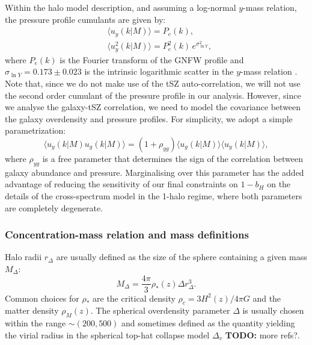 \documentclass[useAMS,usenatbib]{mn2e}
\newcommand{\TODO}[1]{{\bf TODO:} #1}
\begin{document}
      Within the halo model description, and assuming a log-normal $y$-mass relation, the pressure profile cumulants are given by:
      \begin{align}
        &\langle u_y(k|M)\rangle=P_e(k),\\
        &\langle u_y^2(k|M)\rangle=P_e^2(k)\,e^{\sigma_{\ln Y}^2},
      \end{align}
      where $P_e(k)$ is the Fourier transform of the GNFW profile and $\sigma_{\ln Y}=0.173\pm0.023$ is the intrinsic logarithmic scatter in the $y$-mass relation \cite{2016A&A...594A..24P}. Note that, since we do not make use of the tSZ auto-correlation, we will not use the second order cumulant of the pressure profile in our analysis. However, since we analyse the galaxy-tSZ correlation, we need to model the covariance between the galaxy overdensity and pressure profiles. For simplicity, we adopt a simple parametrization:
      \begin{equation}
        \langle u_y(k|M) u_g(k|M)\rangle = (1+\rho_{yg})\langle u_g(k|M)\rangle \langle u_y(k|M)\rangle,
      \end{equation}
      where $\rho_{yg}$ is a free parameter that determines the sign of the correlation between galaxy abundance and pressure. Marginalising over this parameter has the added advantage of reducing the sensitivity of our final constraints on $1-b_H$ on the details of the cross-spectrum model in the 1-halo regime, where both parameters are completely degenerate.              
      
    \subsubsection{Concentration-mass relation and mass definitions}\label{sssec:theory.hm.cm}
      Halo radii $r_\Delta$ are usually defined as the size of the sphere containing a given mass $M_\Delta$:
      \begin{equation}
        M_\Delta = \frac{4\pi}{3}\rho_*(z)\Delta r^3_\Delta.
      \end{equation}
      Common choices for $\rho_*$ are the critical density $\rho_c=3H^2(z)/4\pi G$ and the matter density $\rho_M(z)$. The spherical overdensity parameter $\Delta$ is usually chosen within the range $\sim(200,500)$ and sometimes defined as the quantity yielding the virial radius in the spherical top-hat collapse model $\Delta_v$ \cite{1998ApJ...495...80B} \TODO{more refs?}.
\end{document}
